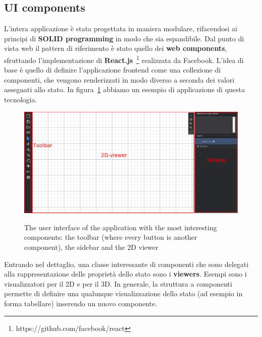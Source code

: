 \subsection{UI components}\label{sec:ui_components}

L'intera applicazione \`e stata progettata in maniera modulare, rifacendosi ai principi di \textbf{SOLID programming} in modo che sia espandibile. Dal punto di vista web il pattern di riferimento \`e stato quello dei \textbf{web components}, sfruttando l'implementazione di \textbf{React.js}~\footnote{https://github.com/facebook/react} realizzata da Facebook. L'idea di base \`e quello di definire l'applicazione frontend come una collezione di componenti, che vengono renderizzati in modo diverso a seconda dei valori assegnati allo stato. In figura~\ref{fig_ui} abbiamo un esempio di applicazione di questa tecnologia. \\

\begin{figure}[h]
\centering
\includegraphics[width=0.65\linewidth]{contents/images/ui}\\
\caption{The user interface of the application with the most interesting components: the toolbar (where every button is another component), the sidebar and the 2D viewer}
\label{fig_ui}
\end{figure}

Entrando nel dettaglio, una classe interessante di componenti che sono delegati alla rappresentazione delle propriet\`a dello stato sono i \textbf{viewers}. Esempi sono i visualizzatori per il 2D e per il 3D. In generale, la struttura a componenti permette di definire una qualunque visualizzazione dello stato (ad esempio in forma tabellare) inserendo un nuovo componente.\\

